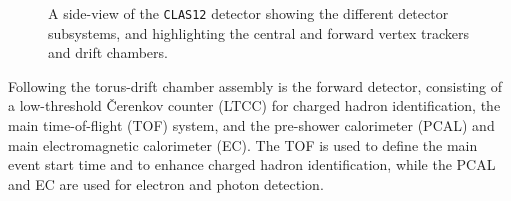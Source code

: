 \begin{figure}[htbp]
\vspace{11.4cm}
\caption{\small{A side-view of the {\tt CLAS12} detector showing the
different detector subsystems, and highlighting the central and forward
vertex trackers and drift chambers.}}
\label{clas12side}
\end{figure}

Following the torus-drift chamber assembly is the forward detector,
consisting of a low-threshold {\v C}erenkov counter (LTCC) for charged 
hadron identification, the main time-of-flight (TOF) system, and the 
pre-shower calorimeter (PCAL) and main electromagnetic calorimeter (EC).  
The TOF is used to define the main event start time and to enhance charged 
hadron identification, while the PCAL and EC are used for electron and
photon detection.

